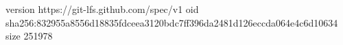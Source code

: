 version https://git-lfs.github.com/spec/v1
oid sha256:832955a8556d18835fdceea3120bdc7ff396da2481d126eccda064e4c6d10634
size 251978
